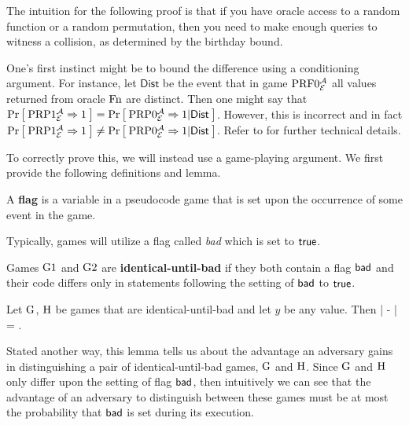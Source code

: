 The intuition for the following proof is that if you have oracle access to a random function or a random permutation, then you need to make enough queries to witness a collision, as determined by the birthday bound. 

One's first instinct might be to bound the difference using a conditioning argument. For instance, let $\mathsf{Dist}$ be the event that in game $\textnormal{PRF}0_{{\cal E}}^{\mathcal A}$ all values returned from oracle $\textnormal{Fn}$ are distinct. Then one might say that $\Pr\left[\: \textnormal{PRP}1_{\cal E}^{\mathcal A}\Rightarrow 1 \:\right] =   \Pr\left[\: \textnormal{PRP}0_{\cal E}^{\mathcal A}\Rightarrow1 | \mathsf{Dist} \:\right]$. However, this is incorrect and in fact $\Pr\left[\: \textnormal{PRP}1_{\cal E}^{\mathcal A}\Rightarrow 1 \:\right] \neq   \Pr\left[\: \textnormal{PRP}0_{\cal E}^{\mathcal A}\Rightarrow1 | \mathsf{Dist} \:\right]$. Refer to \cite{bellare2006multi} for further technical details. 

To correctly prove this, we will instead use a game-playing argument. We first provide the following definitions and lemma. 

\begin{definition}
	A \textbf{flag} is a variable in a pseudocode game that is set upon the occurrence of some event in the game. 
\end{definition}

Typically, games will utilize a flag called \textit{bad} which is set to $\mathsf{true}$.  

\begin{definition}
	Games ${{\textnormal G}}1$ and ${{\textnormal G}}2$ are \textbf{identical-until-bad} if they both contain a flag $\mathsf{bad}$  and their code differs only in statements following the setting of $\mathsf{bad}$ to $\mathsf{true}$. 
\end{definition} 

\begin{lem}
	Let ${{\textnormal G}}$, ${{\textnormal H}}$ be games that are identical-until-bad and let $y$ be any
	value. Then
	\bnm
	\big|  
	-  \big| \le \Prob{\Hgame\setsbad} = \Prob{\G\setsbad}  \;.
	\enm
\end{lem}

Stated another way, this lemma tells us about the advantage an adversary gains in distinguishing a pair of identical-until-bad games, ${{\textnormal G}}$ and ${{\textnormal H}}$. Since ${{\textnormal G}}$ and ${{\textnormal H}}$ only differ upon the setting of flag $\mathsf{bad}$, then intuitively we can see that the advantage of an adversary to distinguish between these games must be at most the probability that $\mathsf{bad}$ is set during its execution.

